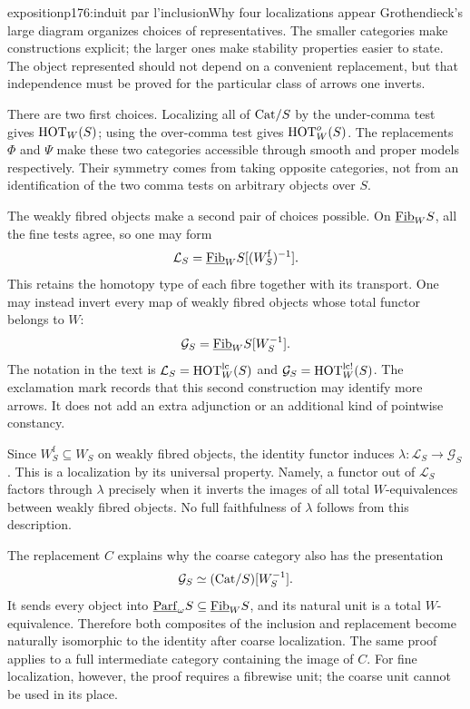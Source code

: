 \begin{dcomment}{exposition}{p176:induit par l'inclusion}{Why four localizations appear}
Grothendieck's large diagram organizes choices of representatives. The smaller categories make constructions explicit; the larger ones make stability properties easier to state. The object represented should not depend on a convenient replacement, but that independence must be proved for the particular class of arrows one inverts.

There are two first choices. Localizing all of $\mathrm{Cat}/S$ by the under-comma test gives $\mathrm{HOT}_W(S)$; using the over-comma test gives $\mathrm{HOT}_W^o(S)$. The replacements $\Phi$ and $\Psi$ make these two categories accessible through smooth and proper models respectively. Their symmetry comes from taking opposite categories, not from an identification of the two comma tests on arbitrary objects over $S$.

The weakly fibred objects make a second pair of choices possible. On $\underline{\mathrm{Fib}}_W S$, all the fine tests agree, so one may form
\[
 \mathcal L_S=\underline{\mathrm{Fib}}_W S[(W_S^{\mathrm f})^{-1}].
\]
This retains the homotopy type of each fibre together with its transport. One may instead invert every map of weakly fibred objects whose total functor belongs to $W$:
\[
 \mathcal G_S=\underline{\mathrm{Fib}}_W S[W_S^{-1}].
\]
The notation in the text is $\mathcal L_S=\mathrm{HOT}_W^{\mathrm{lc}}(S)$ and $\mathcal G_S=\mathrm{HOT}_W^{\mathrm{lc}!}(S)$. The exclamation mark records that this second construction may identify more arrows. It does not add an extra adjunction or an additional kind of pointwise constancy.

Since $W_S^{\mathrm f}\subseteq W_S$ on weakly fibred objects, the identity functor induces $\lambda:\mathcal L_S\to\mathcal G_S$. This is a localization by its universal property. Namely, a functor out of $\mathcal L_S$ factors through $\lambda$ precisely when it inverts the images of all total $W$-equivalences between weakly fibred objects. No full faithfulness of $\lambda$ follows from this description.

The replacement $C$ explains why the coarse category also has the presentation
\[
 \mathcal G_S\simeq(\mathrm{Cat}/S)[W_S^{-1}].
\]
It sends every object into $\underline{\mathrm{Parf}}_\omega S\subseteq\underline{\mathrm{Fib}}_W S$, and its natural unit is a total $W$-equivalence. Therefore both composites of the inclusion and replacement become naturally isomorphic to the identity after coarse localization. The same proof applies to a full intermediate category containing the image of $C$. For fine localization, however, the proof requires a fibrewise unit; the coarse unit cannot be used in its place.


\end{dcomment}
